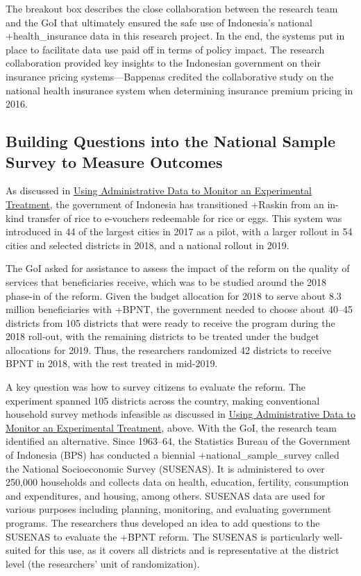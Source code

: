 \documentclass[
]{book}
\begin{document}
The breakout box describes the close collaboration between the research team and the GoI that ultimately ensured the safe use of Indonesia's national +health\_insurance\textbar{} data in this research project. In the end, the systems put in place to facilitate data use paid off in terms of policy impact. The research collaboration provided key insights to the Indonesian government on their insurance pricing systems---Bappenas credited the collaborative study on the national health insurance system when determining insurance premium pricing in 2016.

\hypertarget{building-questions-into-the-national-sample-survey-to-measure-outcomes}{%
\subsection{Building Questions into the National Sample Survey to Measure Outcomes}\label{building-questions-into-the-national-sample-survey-to-measure-outcomes}}

As discussed in \protect\hyperlink{using-administrative-data-to-monitor-an-experimental-treatment}{Using Administrative Data to Monitor an Experimental Treatment}, the government of Indonesia has transitioned +Raskin\textbar{} from an in-kind transfer of rice to e-vouchers redeemable for rice or eggs. This system was introduced in 44 of the largest cities in 2017 as a pilot, with a larger rollout in 54 cities and selected districts in 2018, and a national rollout in 2019.

The GoI asked for assistance to assess the impact of the reform on the quality of services that beneficiaries receive, which was to be studied around the 2018 phase-in of the reform. Given the budget allocation for 2018 to serve about 8.3 million beneficiaries with +BPNT\textbar, the government needed to choose about 40--45 districts from 105 districts that were ready to receive the program during the 2018 roll-out, with the remaining districts to be treated under the budget allocations for 2019. Thus, the researchers randomized 42 districts to receive BPNT in 2018, with the rest treated in mid-2019.

A key question was how to survey citizens to evaluate the reform. The experiment spanned 105 districts across the country, making conventional household survey methods infeasible as discussed in \protect\hyperlink{using-administrative-data-to-monitor-an-experimental-treatment}{Using Administrative Data to Monitor an Experimental Treatment}, above. With the GoI, the research team identified an alternative. Since 1963--64, the Statistics Bureau of the Government of Indonesia (BPS) has conducted a biennial +national\_sample\_survey\textbar{} called the National Socioeconomic Survey (SUSENAS). It is administered to over 250,000 households and collects data on health, education, fertility, consumption and expenditures, and housing, among others. SUSENAS data are used for various purposes including planning, monitoring, and evaluating government programs. The researchers thus developed an idea to add questions to the SUSENAS to evaluate the +BPNT\textbar{} reform. The SUSENAS is particularly well-suited for this use, as it covers all districts and is representative at the district level (the researchers' unit of randomization).
\end{document}
